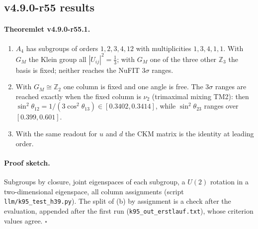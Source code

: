 \subsection*{v4.9.0-r55 results}
\label{subsec:v490-r55-results}

\paragraph{Theoremlet v4.9.0-r55.1.}
\begin{enumerate}[leftmargin=2em]
\item[(a)] \(A_4\) has subgroups of orders \(1,2,3,4,12\) with multiplicities \(1,3,4,1,1\).  With \(G_M\) the Klein group all \(|U_{ij}|^2=\tfrac13\); with
\(G_M\) one of the three other \(\mathbb Z_3\) the basis is fixed; neither reaches the NuFIT \(3\sigma\) ranges.
\item[(b)] With \(G_M\cong\mathbb Z_2\) one column is fixed and one angle is free.  The \(3\sigma\) ranges are reached exactly when the fixed column is \(\nu_2\)
(trimaximal mixing TM2): then \(\sin^2\theta_{12}=1/(3\cos^2\theta_{13})\in[0.3402,0.3414]\), while \(\sin^2\theta_{23}\) ranges over \([0.399,0.601]\).
\item[(c)] With the same readout for \(u\) and \(d\) the CKM matrix is the identity at leading order.
\end{enumerate}

\paragraph{Proof sketch.}
Subgroups by closure, joint eigenspaces of each subgroup, a \(U(2)\) rotation in a two-dimensional eigenspace, all column assignments (script
\texttt{llm/k95\_test\_h39.py}).  The split of (b) by assignment is a check after the evaluation, appended after the first run
(\texttt{k95\_out\_erstlauf.txt}), whose criterion values agree.  \(\square\)

